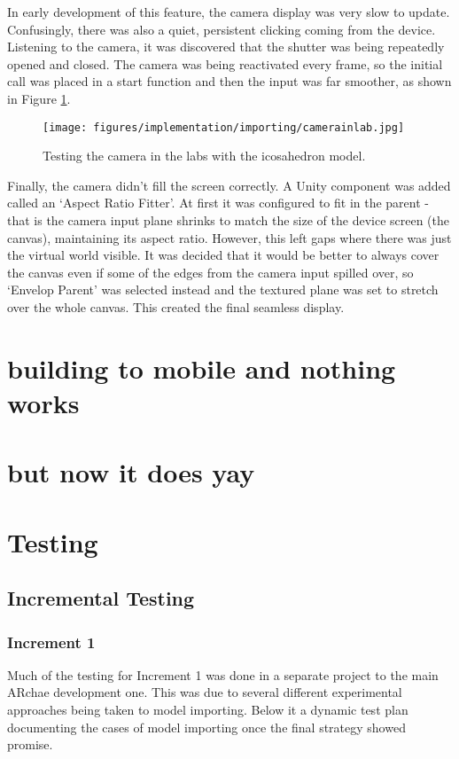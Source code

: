 \documentclass{article}
\begin{document}
In early development of this feature, the camera display was very slow to update. Confusingly, there was also a quiet, persistent clicking coming from the device. Listening to the camera, it was discovered that the shutter was being repeatedly opened and closed. The camera was being reactivated every frame, so the initial call was placed in a start function and then the input was far smoother, as shown in Figure \ref{fig:camerainlab}.

\begin{figure}[]
    \centering
    \texttt{[image: figures/implementation/importing/camerainlab.jpg]}
        \caption{Testing the camera in the labs with the icosahedron model.}
        \label{fig:camerainlab}
\end{figure}

Finally, the camera didn't fill the screen correctly. A Unity component was added called an `Aspect Ratio Fitter'. At first it was configured to fit in the parent - that is the camera input plane shrinks to match the size of the device screen (the canvas), maintaining its aspect ratio. However, this left gaps where there was just the virtual world visible. It was decided that it would be better to always cover the canvas even if some of the edges from the camera input spilled over, so `Envelop Parent' was selected instead and the textured plane was set to stretch over the whole canvas. This created the final seamless display.

\section{building to mobile and nothing works}

\section{but now it does yay}

\section{Testing}

\subsection{Incremental Testing}

\subsubsection{Increment 1}
Much of the testing for Increment 1 was done in a separate project to the main ARchae development one. This was due to several different experimental approaches being taken to model importing. Below it a dynamic test plan documenting the cases of model importing once the final strategy showed promise. 
\end{document}
